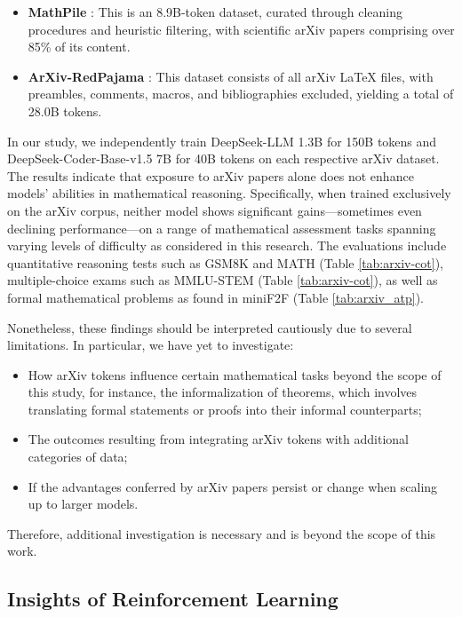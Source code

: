 \begin{itemize}[topsep=0pt]
\begin{itemize}[topsep=0pt]
\begin{itemize}[topsep=0pt]
    \item \textbf{MathPile} \citep{mathpile}: This is an 8.9B-token dataset, curated through cleaning procedures and heuristic filtering, with scientific arXiv papers comprising over 85\% of its content.
    \item \textbf{ArXiv-RedPajama} \citep{redpajama}: This dataset consists of all arXiv LaTeX files, with preambles, comments, macros, and bibliographies excluded, yielding a total of 28.0B tokens.
\end{itemize}

In our study, we independently train DeepSeek-LLM 1.3B for 150B tokens and DeepSeek-Coder-Base-v1.5 7B for 40B tokens on each respective arXiv dataset. The results indicate that exposure to arXiv papers alone does not enhance models’ abilities in mathematical reasoning. Specifically, when trained exclusively on the arXiv corpus, neither model shows significant gains—sometimes even declining performance—on a range of mathematical assessment tasks spanning varying levels of difficulty as considered in this research. The evaluations include quantitative reasoning tests such as GSM8K and MATH (Table \ref{tab:arxiv-cot}), multiple-choice exams such as MMLU-STEM (Table \ref{tab:arxiv-cot}), as well as formal mathematical problems as found in miniF2F (Table \ref{tab:arxiv_atp}).

Nonetheless, these findings should be interpreted cautiously due to several limitations. In particular, we have yet to investigate:

\begin{itemize}[topsep=0pt]
    \item How arXiv tokens influence certain mathematical tasks beyond the scope of this study, for instance, the informalization of theorems, which involves translating formal statements or proofs into their informal counterparts;
    \item The outcomes resulting from integrating arXiv tokens with additional categories of data;
    \item If the advantages conferred by arXiv papers persist or change when scaling up to larger models.
\end{itemize}

Therefore, additional investigation is necessary and is beyond the scope of this work.

\subsection{Insights of Reinforcement Learning}

\end{itemize}
\end{itemize}
